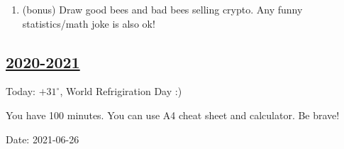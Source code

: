 \begin{enumerate}
\item (bonus) Draw good bees and bad bees selling crypto. Any funny statistics/math joke is also ok!

\end{enumerate}





\subsection[2020-2021]{\hyperref[sec:sol_kr_04_2020_2021]{2020-2021}}
\label{sec:kr_04_2020_2021} %

Today: $+31^{\circ}$,  World Refrigiration Day :)

You have 100 minutes. You can use A4 cheat sheet and calculator. Be brave! 

Date: 2021-06-26

